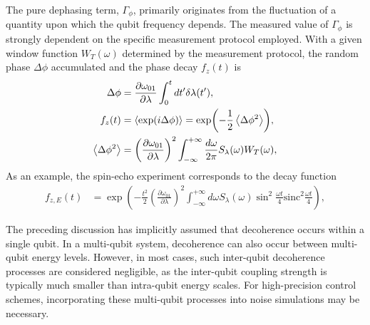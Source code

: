 \documentclass[a4paper,onecolumn,11pt,unpublished]{quantumarticle}
\begin{document}
The pure dephasing term, $\Gamma_{\phi}$, primarily originates from the fluctuation of a quantity upon which the qubit frequency depends. The measured value of $\Gamma_{\phi}$ is strongly dependent on the specific measurement protocol employed. With a given window function $W_T(\omega)$ determined by the measurement protocol, the random phase $\Delta\phi$ accumulated and the phase decay $f_z(t)$ is~\cite{Ithier2005Decoherence,Nguyen2020Toward}
\begin{align}
  \Delta \phi & = \frac{\partial \omega_{01}}{\partial \lambda}\int_0^t dt' \delta \lambda (t'), \label{eq:random_phase_accumulated}                                                                                           \\
  f_z(t)      & = \expval{\exp(i\Delta\phi)} = \exp(-\frac{1}{2}\expval{\Delta\phi^2}), \label{eq:phase_decay_random}                                                                                                           \\
  \expval{\Delta\phi^2} &= \left(\frac{\partial \omega_{01}}{\partial \lambda}\right)^2\int_{-\infty}^{+\infty}\frac{d\omega}{2\pi}S_{\lambda}(\omega)W_T(\omega), \label{eq:phase_window_integral}
\end{align}
As an example, the spin-echo experiment corresponds to the decay function
\begin{align}
  f_{z,E}(t)  & = \exp \left( -\frac{t^2}{2} \left(\frac{\partial \omega_{01}}{\partial \lambda}\right)^2\int_{-\infty}^{+\infty}d\omega S_{\lambda}(\omega)\sin^2\frac{\omega t}{4}\mathrm{sinc}^2\frac{\omega t}{4}  \right), \label{eq:tphi_echo}
\end{align}

The preceding discussion has implicitly assumed that decoherence occurs within a single qubit. In a multi-qubit system, decoherence can also occur between multi-qubit energy levels. However, in most cases, such inter-qubit decoherence processes are considered negligible, as the inter-qubit coupling strength is typically much smaller than intra-qubit energy scales. For high-precision control schemes, incorporating these multi-qubit processes into noise simulations may be necessary.
\end{document}
